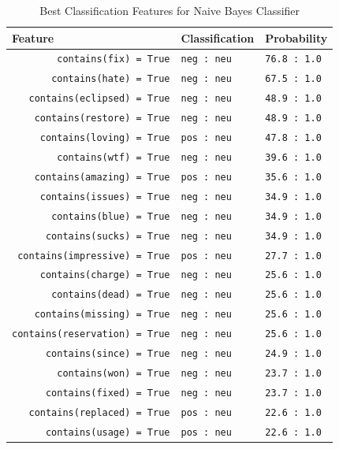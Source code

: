 \begin{table}[h]
\centering
\begin{tabular}{|l|l|l|}
\hline
Feature & Classification & Probability \\
\hline
\verb'        contains(fix) = True' & \verb'neg : neu' & \verb'76.8 : 1.0' \\
\verb'       contains(hate) = True' & \verb'neg : neu' & \verb'67.5 : 1.0' \\
\verb'   contains(eclipsed) = True' & \verb'neg : neu' & \verb'48.9 : 1.0' \\
\verb'    contains(restore) = True' & \verb'neg : neu' & \verb'48.9 : 1.0' \\
\verb'     contains(loving) = True' & \verb'pos : neu' & \verb'47.8 : 1.0' \\
\verb'        contains(wtf) = True' & \verb'neg : neu' & \verb'39.6 : 1.0' \\
\verb'    contains(amazing) = True' & \verb'pos : neu' & \verb'35.6 : 1.0' \\
\verb'     contains(issues) = True' & \verb'neg : neu' & \verb'34.9 : 1.0' \\
\verb'       contains(blue) = True' & \verb'neg : neu' & \verb'34.9 : 1.0' \\
\verb'      contains(sucks) = True' & \verb'neg : neu' & \verb'34.9 : 1.0' \\
\verb' contains(impressive) = True' & \verb'pos : neu' & \verb'27.7 : 1.0' \\
\verb'     contains(charge) = True' & \verb'neg : neu' & \verb'25.6 : 1.0' \\
\verb'       contains(dead) = True' & \verb'neg : neu' & \verb'25.6 : 1.0' \\
\verb'    contains(missing) = True' & \verb'neg : neu' & \verb'25.6 : 1.0' \\
\verb'contains(reservation) = True' & \verb'neg : neu' & \verb'25.6 : 1.0' \\
\verb'      contains(since) = True' & \verb'neg : neu' & \verb'24.9 : 1.0' \\
\verb'        contains(won) = True' & \verb'neg : neu' & \verb'23.7 : 1.0' \\
\verb'      contains(fixed) = True' & \verb'neg : neu' & \verb'23.7 : 1.0' \\
\verb'   contains(replaced) = True' & \verb'pos : neu' & \verb'22.6 : 1.0' \\
\verb'      contains(usage) = True' & \verb'pos : neu' & \verb'22.6 : 1.0' \\
\hline
\end{tabular}
\caption{Best Classification Features for Naive Bayes Classifier}
\label{table:naive_features}
\end{table}




